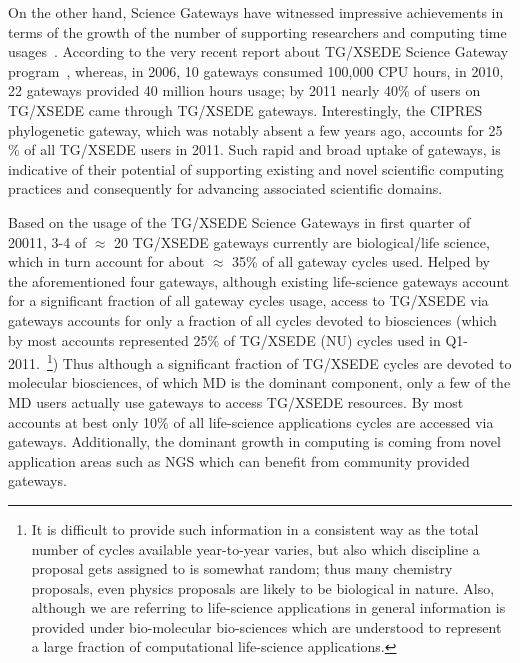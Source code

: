 \documentclass[]{svjour3}
\begin{document}


On the other hand, Science Gateways have witnessed impressive
achievements in terms of the growth of the number of supporting
researchers and computing time usages~\cite{gce11-nancy}. According to
the very recent report about TG/XSEDE Science Gateway
program~\cite{gce11-nancy}, whereas, in 2006, 10 gateways consumed
100,000 CPU hours, in 2010, 22 gateways provided 40 million hours
usage; by 2011 nearly 40\% of users on TG/XSEDE came through TG/XSEDE
gateways. Interestingly, the CIPRES phylogenetic gateway, which was
notably absent a few years ago, accounts for 25 \% of all TG/XSEDE
users in 2011. Such rapid and broad uptake of gateways, is indicative
of their potential of supporting existing and novel scientific
computing practices and consequently for advancing associated
scientific domains.

 
Based on the usage of the TG/XSEDE Science Gateways in first quarter
of 20011, 3-4 of $\approx$ 20 TG/XSEDE gateways currently are
biological/life science, which in turn account for about $\approx$
35\% of all gateway cycles used. Helped by the aforementioned four
gateways, although existing life-science gateways account for a
significant fraction of all gateway cycles usage, access to TG/XSEDE
via gateways accounts for only %
a fraction of all cycles devoted to biosciences
(which by most accounts represented 25\% of TG/XSEDE (NU) cycles used
in Q1-2011.~\footnote{It is difficult to provide such information in a
  consistent way as the total number of cycles available year-to-year
  varies, but also which discipline a proposal gets assigned to is
  somewhat random; thus many chemistry proposals, even physics
  proposals are likely to be biological in nature. Also, although we
  are referring to life-science applications in general information is
  provided under bio-molecular bio-sciences which are understood to
  represent a large fraction of computational life-science
  applications.})  Thus although a significant fraction of TG/XSEDE
cycles are devoted to molecular biosciences, of which MD is the
dominant component, only a few of the MD users actually use gateways
to access TG/XSEDE resources.  By most accounts at best only 10\% of
all life-science applications cycles are accessed via gateways.
Additionally, the dominant growth in computing is coming from novel
application areas such as NGS which can benefit from community
provided gateways.
\end{document}
